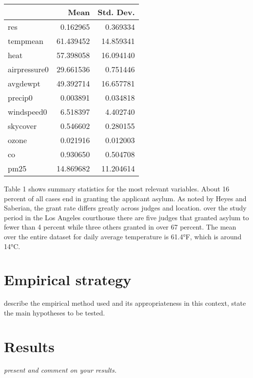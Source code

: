 \documentclass[11pt]{article}
\begin{document}
	\begin{center}
	\begin{tabular}{lrr}
		\toprule
		{} &       Mean &  Std. Dev. \\
		\midrule
		res          &   0.162965 &   0.369334 \\
		tempmean     &  61.439452 &  14.859341 \\
		heat         &  57.398058 &  16.094140 \\
		airpressure0 &  29.661536 &   0.751446 \\
		avgdewpt     &  49.392714 &  16.657781 \\
		precip0      &   0.003891 &   0.034818 \\
		windspeed0   &   6.518397 &   4.402740 \\
		skycover     &   0.546602 &   0.280155 \\
		ozone        &   0.021916 &   0.012003 \\
		co           &   0.930650 &   0.504708 \\
		pm25         &  14.869682 &  11.204614 \\
		\bottomrule
	\end{tabular}
	\end{center}
	
	Table 1 shows summary statistics for the most relevant variables. About 16 percent of all cases end in granting the applicant asylum. As noted by Heyes and Saberian, the grant rate differs greatly across judges and location. over the study period in the Los Angeles courthouse there are five judges that granted asylum to fewer than 4 percent while three others granted in over 67 percent. The mean over the entire dataset for daily average temperature is 61.4°F, which is around 14°C.
	\section{Empirical strategy}
	\textit{}describe the empirical method used and its appropriateness in this
	context, state the main hypotheses to be tested.
	\section{Results}
	\textit{present and comment on your results.}
	
\end{document}
